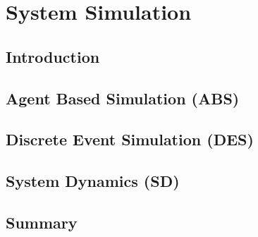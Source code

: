 \chapter{System Simulation} \label{chap:simulation}

\section*{}

\section{Introduction}

\section{Agent Based Simulation (ABS)}

\cite{Siebers2010}

\section{Discrete Event Simulation (DES)}

\cite{Siebers2010}

\section{System Dynamics (SD)}

\cite{Siebers2010}

\section{Summary}
